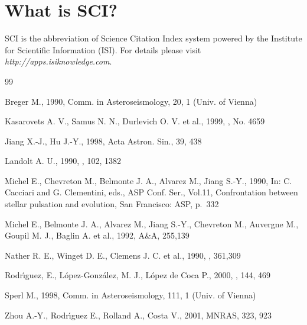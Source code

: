 \documentclass[referee]{raa}            %
\begin{document}
\section{What is SCI?}
SCI is the abbreviation of Science Citation Index system powered by
the Institute for Scientific Information (ISI). For details please
visit {\it http://apps.isiknowledge.com}.



\begin{thebibliography}{99}

   Breger M., 1990,
     Comm. in Asteroseismology, 20, 1 (Univ. of Vienna)

   Kasarovets A. V., Samus N. N., Durlevich O. V. et al.,
  1999, \ibvs, No. 4659

   Jiang X.-J., Hu J.-Y., 1998, Acta Astron. Sin., 39, 438

   Landolt A. U., 1990, \pasp, 102, 1382

   Michel E., Chevreton M., Belmonte J. A., Alvarez M.,
  Jiang S.-Y., 1990, In: C. Cacciari and G. Clementini, eds.,
  ASP Conf. Ser., Vol.11, Confrontation between stellar pulsation and evolution,
  San Francisco: ASP, p.~332

   Michel E., Belmonte J. A., Alvarez M., Jiang S.-Y., Chevreton M.,
  Auvergne M., Goupil M. J., Baglin A. et al., 1992, A\&A, 255,139

   Nather R. E., Winget D. E., Clemens J. C. et al.,
  1990, \apj, 361,309

   Rodr\'{\i}guez, E., L\'{o}pez-Gonz\'{a}lez, M. J.,
     L\'{o}pez de Coca P., 2000, \aaps, 144, 469

   Sperl M., 1998, Comm. in Asteroseismology,
  111, 1 (Univ. of Vienna)

   Zhou A.-Y., Rodr\'{\i}guez E., Rolland A.,
     Costa V., 2001, MNRAS, 323, 923

\end{thebibliography}

\label{lastpage}
\end{document}

